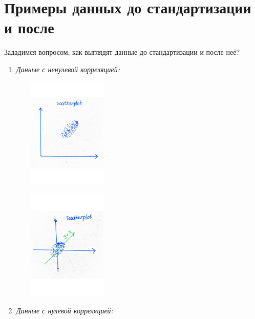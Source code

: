 \documentclass[specialist, 12pt,
subf, %
href, colorlinks=true,
substylefile = spbu.rtx,
]{disser}
\begin{document}
\section{Примеры данных до стандартизации и после}
Зададимся вопросом, как выглядят данные до стандартизации и после неё? \\
\begin{enumerate}
	\item \textit{Данные с ненулевой корреляцией:}
	
	\begin{minipage}{0.51\linewidth}
			\centering
		\includegraphics[width=150pt, height=150pt]{p01}
		
	\end{minipage}
	\begin{minipage}{0.51\linewidth}
			\centering
		\includegraphics[width=150pt, height=150pt]{p02}
		\label{p02}
	\end{minipage}

\newpage
	\item \textit{Данные с нулевой корреляцией:}
	

\end{enumerate}
\end{document}
